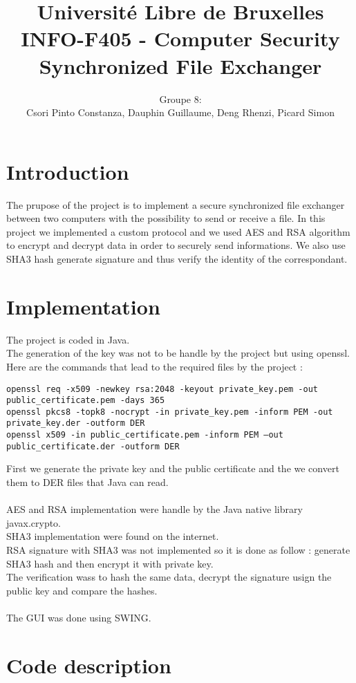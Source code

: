\documentclass[a4paper,10pt]{article}
\title{Université Libre de Bruxelles \\
INFO-F405 - Computer Security \\
Synchronized File Exchanger}
\author{Groupe 8: \\
Csori Pinto Constanza, Dauphin Guillaume, Deng Rhenzi, Picard Simon}
\begin{document}
\maketitle
\clearpage
\tableofcontents
\clearpage

\section{Introduction}
The prupose of the project is to implement a secure synchronized file exchanger between two computers with the possibility to send or receive a file. In this project we implemented a custom protocol and we used AES and RSA algorithm to encrypt and decrypt data in order to securely send informations. We also use SHA3 hash generate signature and thus verify the identity of the correspondant.


\section{Implementation}
The project is coded in Java.\\
The generation of the key was not to be handle by the project but using openssl.\\
Here are the commands that lead to the required files by the project :
\begin{verbatim}
openssl req -x509 -newkey rsa:2048 -keyout private_key.pem -out public_certificate.pem -days 365
openssl pkcs8 -topk8 -nocrypt -in private_key.pem -inform PEM -out private_key.der -outform DER
openssl x509 -in public_certificate.pem -inform PEM –out public_certificate.der -outform DER
\end{verbatim}
First we generate the private key and the public certificate and the we convert them to DER files that Java can read.\\
\\
AES and RSA implementation were handle by the Java native library javax.crypto.\\
SHA3 implementation were found on the internet.\\
RSA signature with SHA3 was not implemented so it is done as follow : generate SHA3 hash and then encrypt it with private key.\\
The verification wass to hash the same data, decrypt the signature usign the public key and compare the hashes.\\
\\
The GUI was done using SWING.

\section{Code description}
\end{document}
